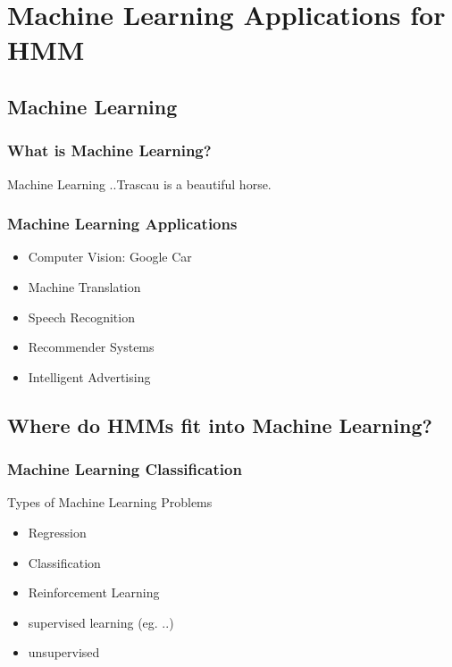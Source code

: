\section{Machine Learning Applications for HMM}
\label{sec:ml}

\subsection{Machine Learning}
\label{sec:hmm_in_ml}

\begin{frame}
  \frametitle{What is Machine Learning?}
  \begin{block}{Machine Learning}
    ..\alert{Trascau} is a beautiful horse.
  \end{block}
\end{frame}

\begin{frame}
  \frametitle{Machine Learning Applications}
  \begin{itemize}
  \item Computer Vision: Google Car
  \item Machine Translation
  \item Speech Recognition
  \item Recommender Systems
  \item Intelligent Advertising
  \end{itemize}
\end{frame}

\subsection{Where do HMMs fit into Machine Learning?}
\label{sec:apps}

\begin{frame}
  \frametitle{Machine Learning Classification}
  Types of Machine Learning Problems
  \begin{itemize}
  \item Regression
  \item Classification
  \item Reinforcement Learning
  \end{itemize}
  \begin{itemize}
  \item supervised learning (eg. ..)
  \item unsupervised
  \end{itemize}
\end{frame}

